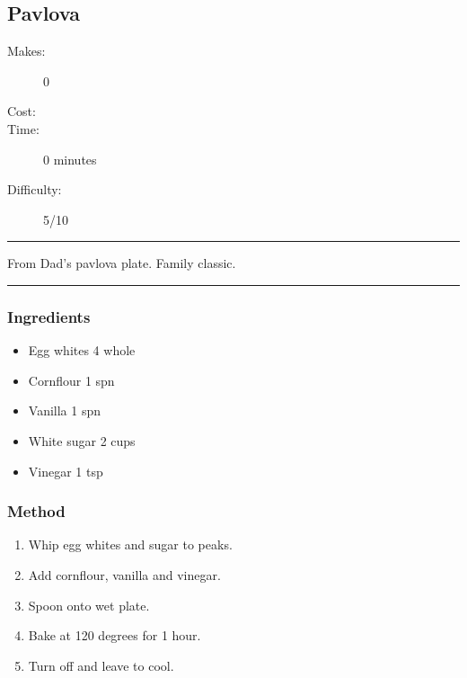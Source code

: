 \documentclass[]{article}
\begin{document}
\subsection*{\center\huge Pavlova}
\begin{description}
\item[Makes:] 0 
\item[Cost:] \textdollar
\item[Time:] 0 minutes
\item[Difficulty:] 5/10
\end{description}
\vspace{0.2cm}\hrule\vspace{0.5cm}
\begin{adjustwidth}{0.5 cm}{0.5 cm}

From Dad's pavlova plate. Family classic. \hfill\color{accent}{\Large\faVimeoSquare\hspace{0.1cm}\faGlide\hspace{0.1cm}\faHeart\hspace{0.1cm}}\color{black}

\end{adjustwidth}
\vspace{0.5cm}\hrule
\subsubsection*{\Large Ingredients}
\begin{multicols}{2}
\begin{itemize}
 \item Egg whites \hfill 4 whole
 \item Cornflour \hfill 1 spn
 \item Vanilla \hfill 1 spn
 \item White sugar \hfill 2 cups
 \item Vinegar \hfill 1 tsp
\end{itemize}
\end{multicols}
\subsubsection*{\Large Method}
\begin{enumerate}[font=\huge\color{accent}]
	\item Whip egg whites and sugar to peaks.
	\item Add cornflour, vanilla and vinegar.
	\item Spoon onto wet plate.
	\item Bake at 120 degrees for 1 hour.
	\item Turn off and leave to cool.
\end{enumerate}
\newpage
{}\label{rec:Vanilla Butter Cake}
\end{document}
